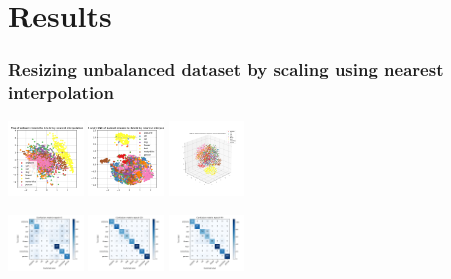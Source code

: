 \documentclass{article}
\begin{document}
\section{Results}
\begin{minipage}[c]{\textwidth}

\subsubsection{Resizing unbalanced dataset by scaling using nearest interpolation}
	\centering
\includegraphics[width= 0.15\textwidth]{./figures/pca_h32_w32_r_none.png}
\includegraphics[width= 0.15\textwidth]{./figures/pca_tsne_h32_w32_r_none.png}
\includegraphics[width= 0.15\textwidth]{./figures/tsne_h32_w32_r_none.png}	

\includegraphics[width= 0.15\textwidth]{./figures/cm_h32_w32_r_none_e0.png}
\includegraphics[width= 0.15\textwidth]{./figures/cm_h32_w32_r_none_e20.png}
\includegraphics[width= 0.15\textwidth]{./figures/cm_h32_w32_r_none_e49.png}

\end{minipage}
\end{document}
